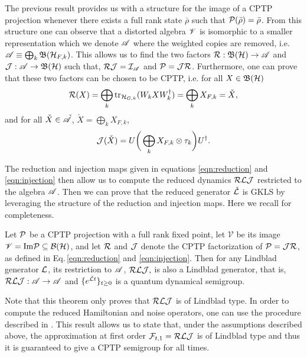 \documentclass[10pt,aps,pra,twocolumn,showpacs,superscriptaddress,nobalancelastpage,notitlepage,nofootinbib,longbibliography]{revtex4-2}
\begin{document}
The previous result provides us with a structure for the image of a  CPTP projection whenever there exists a full rank state $\bar{\rho}$ such that $\mathcal{P}(\bar{\rho}) = \bar{\rho}$. From this structure one can observe that a distorted algebra $\mathscr{V}$ is isomorphic to a smaller representation which we denote $\mathscr{A}$ where the weighted copies are removed, i.e. $\mathscr{A} \equiv \bigoplus_k \mathfrak{B}(\mathcal{H}_{F,k})$. This allows us to find the two factors $\mathcal{R}:\mathfrak{B}(\mathcal{H})\to{\mathscr{A}}$ and $\mathcal{J}:{\mathscr{A}}\to\mathfrak{B}(\mathcal{H})$ such that, $\mathcal{R}\mathcal{J} = \mathcal{I}_{{\mathscr{A}}}$ and $\mathcal{P} = \mathcal{J}\mathcal{R}$. 
Furthermore, one can prove \cite{grigoletto2024exact} that these two factors can be chosen to be CPTP, i.e. for all $X\in\mathfrak{B}(\mathcal{H})$
\begin{equation}
\label{eqn:reduction}
\mathcal{R}(X)=\bigoplus_k {\rm tr}_{\mathcal{H}_{G,k}}(W_k X W_k^\dag)=\bigoplus_k X_{F,k}=\check X ,
\end{equation}
and for all $\check{X}\in\check{\mathscr{A}}$, $\check{X}=\bigoplus_k X_{F,k}$,
\begin{equation}
\label{eqn:injection}
\mathcal{J}(\check X)=U\bigg(\bigoplus_k X_{F,k} \otimes\tau_{k}\bigg)U^\dag.
\end{equation}

The reduction and injection maps given in equations \eqref{eqn:reduction} and \eqref{eqn:injection} then allow us to compute the reduced dynamics $ \mathcal{R}\mathcal{L}\mathcal{J}$ restricted to the algebra ${\mathscr{A}}$. Then we can prove that the reduced generator $\check{\mathcal{L}}$ is GKLS by leveraging the structure of the reduction and injection maps. Here we recall \cite[Theorem 4]{grigoletto2024exact} for completeness.
\begin{theorem}
\label{thm:Lindblad_reduction}
Let $\mathcal{P}$ be a CPTP projection with a full rank fixed point, let $\mathscr{V}$ be its image $\mathscr{V} = {\rm Im }\mathcal{P} \subseteq \mathcal{B(H)}$, and let $\mathcal{R}$ and $\mathcal{J}$ denote the CPTP factorization of $\mathcal{P} = \mathcal{J}\mathcal{R}$, as defined in Eq.\,\eqref{eqn:reduction} and \eqref{eqn:injection}. Then for any Lindblad generator $\mathcal{L}$, its restriction to ${\mathscr{A}}$, 
$\mathcal{R}\mathcal{L}\mathcal{J},$ 
is also a Lindblad generator, that is, $\mathcal{R}\mathcal{L}\mathcal{J}:\mathscr{A}\to\mathscr{A}$ and $\{e^{\check{\mathcal{L}}t}\}_{t\geq 0}$ is a quantum dynamical semigroup. 
\end{theorem}
Note that this theorem only proves that $\mathcal{R}\mathcal{L}\mathcal{J}$ is of Lindblad type. In order to compute the reduced Hamiltonian and noise operators, one can use the procedure described in \cite[Appendix]{grigoletto2025quantummodelreductioncontinuoustime}.
This result allows us to state that, under the assumptions described above, the approximation at first order $\mathcal{F}_{t,1} = \mathcal{R}\mathcal{L}\mathcal{J}$ is of Lindblad type and thus it is guaranteed to give a CPTP semigroup for all times.    
\end{document}
